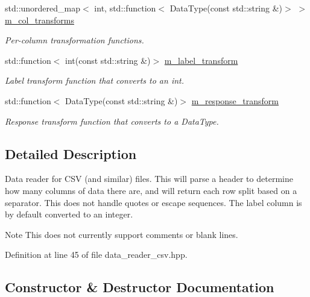 \begin{DoxyCompactItemize}
std\+::unordered\+\_\+map$<$ int, std\+::function$<$ Data\+Type(const std\+::string \&)$>$ $>$ \hyperlink{classlbann_1_1csv__reader_aad98a20225b1f2545de32b4c19c8285b}{m\+\_\+col\+\_\+transforms}
\begin{DoxyCompactList}\small\item\em Per-\/column transformation functions. \end{DoxyCompactList}\item 
std\+::function$<$ int(const std\+::string \&)$>$ \hyperlink{classlbann_1_1csv__reader_aa9b671a172828980cb9c91180c3d0ad8}{m\+\_\+label\+\_\+transform}
\begin{DoxyCompactList}\small\item\em Label transform function that converts to an int. \end{DoxyCompactList}\item 
std\+::function$<$ Data\+Type(const std\+::string \&)$>$ \hyperlink{classlbann_1_1csv__reader_a161c3606668efbc8910cad2f7fa01ed3}{m\+\_\+response\+\_\+transform}
\begin{DoxyCompactList}\small\item\em Response transform function that converts to a Data\+Type. \end{DoxyCompactList}\end{DoxyCompactItemize}


\subsection{Detailed Description}
Data reader for C\+SV (and similar) files. This will parse a header to determine how many columns of data there are, and will return each row split based on a separator. This does not handle quotes or escape sequences. The label column is by default converted to an integer. \begin{DoxyNote}{Note}
This does not currently support comments or blank lines. 
\end{DoxyNote}


Definition at line 45 of file data\+\_\+reader\+\_\+csv.\+hpp.



\subsection{Constructor \& Destructor Documentation}
\mbox{\label{classlbann_1_1csv__reader_ac301a4c8e2ef029b65e8f6b8cbbc5855}} 
